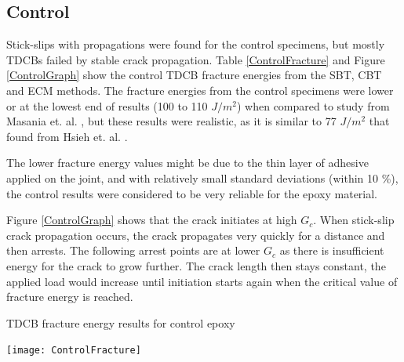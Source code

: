 \documentclass[numbers=noendperiod,chapterprefix=on]{icldt} %
\begin{document}

\subsection{Control}
Stick-slips with propagations were found for the control specimens, but mostly TDCBs failed by stable crack  propagation. Table \ref{ControlFracture} and Figure \ref{ControlGraph} show the control TDCB fracture energies from the SBT, CBT and ECM methods. 
The fracture energies from the control specimens were lower or at the lowest end of results (100 to 110 $ J/m^{2} $) when compared to study from Masania et. al. \cite{MasaniaTaylorA.C.KinlochA.J.andSprengerS., Johnsen2007}, but these results were realistic, as it is similar to 77 $ J/m^{2} $ that found from Hsieh et. al. \cite{Hsieha}.

The lower fracture energy values might be due to the thin layer of adhesive applied on the joint, and with relatively small standard deviations (within 10 \%), the control results were considered to be very reliable for the epoxy material.

Figure \ref{ControlGraph} shows that the crack initiates at high $ G_{c} $. When stick-slip crack propagation occurs, the crack propagates very quickly for a distance and then arrests. The following arrest points are at lower $ G_{c} $ as there is insufficient energy for the crack to grow further. The crack length then stays constant, the applied load would increase until initiation starts again when the critical value of fracture energy is reached. 

\begin{table}[!htpb]
\centering
\caption{TDCB fracture energy results for control epoxy} \label{ControlFracture}
\texttt{[image: ControlFracture]}
\end{table}

\end{document}
